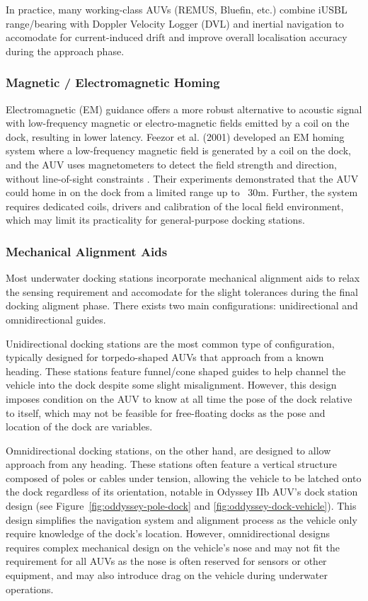 In practice, many working-class AUVs (REMUS, Bluefin, etc.) combine iUSBL range/bearing with Doppler Velocity Logger (DVL) and inertial navigation to accomodate for current-induced drift and improve overall localisation accuracy during the approach phase.

\subsubsection{Magnetic / Electromagnetic Homing}
Electromagnetic (EM) guidance offers a more robust alternative to acoustic signal with low-frequency magnetic or electro-magnetic fields emitted by a coil on the dock, resulting in lower latency. Feezor et al. (2001) developed an EM homing system where a low-frequency magnetic field is generated by a coil on the dock, and the AUV uses magnetometers to detect the field strength and direction, without line-of-sight constraints \cite{feezor2001autonomous}. Their experiments demonstrated that the AUV could home in on the dock from a limited range up to ~30m. Further, the system requires dedicated coils, drivers and calibration of the local field environment, which may limit its practicality for general-purpose docking stations.

\subsubsection{Mechanical Alignment Aids}
Most underwater docking stations incorporate mechanical alignment aids to relax the sensing requirement and accomodate for the slight tolerances during the final docking aligment phase. There exists two main configurations: unidirectional and omnidirectional guides.

Unidirectional docking stations are the most common type of configuration, typically designed for torpedo-shaped AUVs that approach from a known heading. These stations feature funnel/cone shaped guides to help channel the vehicle into the dock despite some slight misalignment. However, this design imposes condition on the AUV to know at all time the pose of the dock relative to itself, which may not be feasible for free-floating docks as the pose and location of the dock are variables.

Omnidirectional docking stations, on the other hand, are designed to allow approach from any heading. These stations often feature a vertical structure composed of poles or cables under tension, allowing the vehicle to be latched onto the dock regardless of its orientation, notable in Odyssey IIb AUV's dock station design (see Figure~\ref{fig:oddyssey-pole-dock} and \ref{fig:oddyssey-dock-vehicle}). This design simplifies the navigation system and alignment process as the vehicle only require knowledge of the dock's location. However, omnidirectional designs requires complex mechanical design on the vehicle's nose and may not fit the requirement for all AUVs as the nose is often reserved for sensors or other equipment, and may also introduce drag on the vehicle during underwater operations.

